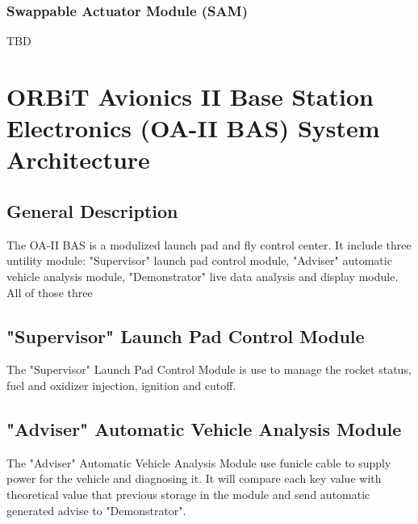 \documentclass[12pt,article]{memoir}
\begin{document}
\subsection{Swappable Actuator Module (SAM)}%
TBD
\chapter{ORBiT Avionics II Base Station Electronics (OA-II BAS) System Architecture}
\section{General Description}
The OA-II BAS is a modulized launch pad and fly control center. It include three untility module: "Supervisor" launch pad control module, "Adviser" automatic vehicle analysis module, "Demonstrator" live data analysis and display module. All of those three 
\section{"Supervisor" Launch Pad Control Module}
The "Supervisor" Launch Pad Control Module is use to manage the rocket status, fuel and oxidizer injection, ignition and cutoff.
\section{"Adviser" Automatic Vehicle Analysis Module}
The "Adviser" Automatic Vehicle Analysis Module use funicle cable to supply power for the vehicle and diagnosing it. It will compare each key value with theoretical value that previous storage in the module and send automatic generated advise to "Demonstrator".
\end{document}
